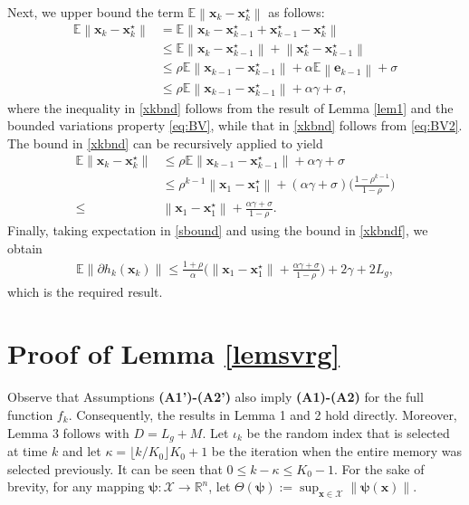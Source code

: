 \documentclass[draftcls,onecolumn,12pt]{IEEEtran}
\theoremstyle{plain}
\def\x{\mathbf{x}}
\def\e{\mathbf{e}}
\def\cX {\mathcal{X}}
\def\Rn{\mathbb{R}}
\def\xks{\x_k^\star}
\def\psib{\boldsymbol{\psi}}
\def\EE{\mathbb{E}}
\providecommand{\norm}[1]{\left\|#1\right\|}
\theoremstyle{plain}
\theoremstyle{remark}
\begin{document}
\begin{IEEEproof}
Next, we upper bound the term $\EE\norm{\x_{k} - \xks}$ as follows:
\begin{align}
\EE\norm{\x_{k} - \xks} &=  \EE\norm{\x_{k} - \x_{k-1}^\star + \x_{k-1}^\star - \xks} \\
	&\leq  \EE\norm{\x_{k} - \x_{k-1}^\star} + \norm{\xks - \x_{k-1}^\star}\\
	&\leq  \rho \EE\norm{\x_{k-1} - \x_{k-1}^\star} + \alpha \EE\norm{\e_{k-1}} + \sigma \label{xkbnd0}\\
	&\leq \rho \EE\norm{\x_{k-1} - \x_{k-1}^\star} + \alpha \gamma + \sigma	\label{xkbnd},			
\end{align}
where the inequality in \eqref{xkbnd} follows from the result of Lemma \ref{lem1} and the bounded variations property \eqref{eq:BV}, while that in \eqref{xkbnd} follows from \eqref{eq:BV2}. The bound in \eqref{xkbnd} can be recursively applied to yield
\begin{align}
\EE\norm{\x_k - \xks}
&\leq  \rho \EE\norm{\x_{k-1} - \x_{k-1}^\star} + \alpha \gamma + \sigma  \nonumber\\
&\!\!\!\!\!\!\!\leq  \rho^{k-1} \norm{\x_{1} - \x_{1}^\star} + (\alpha \gamma + \sigma)\bigg( \frac{1 - \rho^{k-1}}{1-\rho} \bigg)\label{xkbndf0} \\
\leq &  \norm{\x_{1} - \x_{1}^\star} + \frac{\alpha \gamma + \sigma}{1-\rho} \label{xkbndf}  .
\end{align}
Finally, taking expectation in \eqref{sbound} and using the bound in \eqref{xkbndf}, we obtain
\begin{align}
\!\!\!\!\EE\norm{\partial  h_k\!(\!\x_k\!)\!} \!\leq  \! \frac{1\!\!+\!\!\rho}{\alpha} \bigg(\!\!\!\norm{\x_1-\x_1^\star} +  \frac{\alpha \gamma + \sigma}{1-\rho} \bigg)  +   2\gamma + 2L_g,
\end{align}
which is the required result. \end{IEEEproof}
 

\section{Proof of Lemma \ref{lemsvrg}} \label{proof_pro2}	
Observe that Assumptions \textbf{(A1')-(A2')} also imply \textbf{(A1)-(A2)} for the full function $f_k$. Consequently, the results in Lemma 1 and 2 hold directly. Moreover, Lemma 3 follows with $D = L_g + M$. Let $\iota_k$ be the random index that is selected at time $k$ and let $\kappa = \lfloor k/K_0\rfloor K_0 + 1$ be the iteration when the entire memory was selected previously. It can be seen that $0\leq k-\kappa \leq K_0-1$. For the sake of brevity, for any mapping $\psib:\cX \rightarrow \Rn^n$, let $\Theta(\psib):=\sup_{\x\in\cX} \norm{\psib(\x)}$. 
\end{document}
